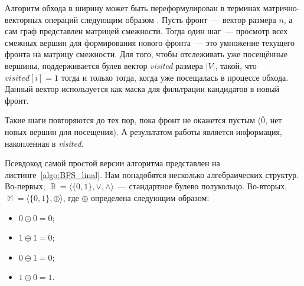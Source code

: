 Алгоритм обхода в ширину может быть переформулирован в терминах матрично-векторных операций следующим образом%
.
Пусть фронт~--- вектор размера $n$, а сам граф представлен матрицей смежности.
Тогда один шаг~--- просмотр всех смежных вершин для формирования нового фронта~--- это умножение текущего фронта на матрицу смежности.
Для того, чтобы отслеживать уже посещённые вершины, поддерживается булев вектор \emph{visited} размера $|V|$, такой, что $\mathit{visited}[i] = 1$ тогда и только тогда, когда   уже посещалась в процессе обхода.
Данный вектор используется как маска для фильтрации кандидатов в новый фронт.

Такие шаги повторяются до тех пор, пока фронт не окажется пустым ($\overline{0}$, нет новых вершин для посещения).
А результатом работы является информация, накопленная в \emph{visited}.

Псевдокод самой простой версии алгоритма представлен на листинге~\ref{algo:BFS_linal}.
Нам понадобятся несколько алгебраических структур.
Во-первых, $\BbbB = \langle \{0,1\},\vee, \wedge \rangle$~--- стандартное булево полукольцо.
Во-вторых, $\BbbM = \langle \{0,1\},\oplus \rangle$, где $\oplus$ определена следующим образом:
\begin{minipage}{0.25\textwidth}
    \begin{itemize}
        \item $0 \oplus 0 = 0$;
        \item $1 \oplus 1 = 0$;
    \end{itemize}
\end{minipage}
\begin{minipage}{0.25\textwidth}
    \begin{itemize}
        \item $0 \oplus 1 = 0$;
        \item $1 \oplus 0 = 1$.
    \end{itemize}
\end{minipage}

